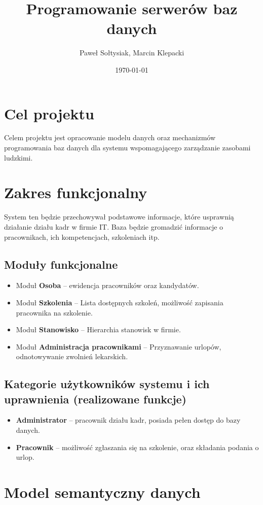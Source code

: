 \documentclass[a4paper]{article}
\title{Programowanie serwerów baz danych}
\author{Paweł Sołtysiak, Marcin Klepacki}
\date{\today}
\begin{document}

\tableofcontents
\listoftables
\section{Cel projektu}
Celem projektu jest opracowanie modelu danych oraz mechanizmów programowania baz danych dla systemu wspomagającego zarządzanie zasobami ludzkimi.

\section{Zakres funkcjonalny}
System ten będzie przechowywał podstawowe informacje, które usprawnią działanie działu kadr w firmie IT. Baza będzie gromadzić informacje o pracownikach, ich kompetencjach, szkoleniach itp.
\subsection{Moduły funkcjonalne}
\begin{itemize}
\item Moduł \textbf{Osoba} -- ewidencja pracowników oraz kandydatów.
\item Moduł \textbf{Szkolenia} -- Lista dostępnych szkoleń, możliwość zapisania pracownika na szkolenie.
\item Moduł \textbf{Stanowisko} -- Hierarchia stanowisk w firmie.
\item Moduł \textbf{Administracja pracownikami} -- Przyznawanie urlopów, odnotowywanie zwolnień lekarskich.
\end{itemize}
\subsection{Kategorie użytkowników systemu i ich uprawnienia (realizowane funkcje)}
\begin{itemize}
\item \textbf{Administrator} -- pracownik działu kadr, posiada pełen dostęp do bazy danych.
\item \textbf{Pracownik} -- możliwość zgłaszania się na szkolenie, oraz składania podania o urlop.

\end{itemize}
\section{Model semantyczny danych}
\end{document}
